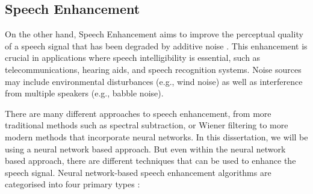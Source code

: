 \documentclass[logo,bsc,singlespacing,parskip,online]{infthesis}
\begin{document}

\subsection{Speech Enhancement}
On the other hand, Speech Enhancement aims to improve the perceptual quality of a speech signal that 
has been degraded by additive noise \citep{loizou_speech_2007}. 
This enhancement is crucial in applications where speech intelligibility is essential, such as telecommunications, hearing aids, and speech recognition systems. Noise sources may include environmental disturbances (e.g., wind noise) as well as interference from multiple speakers (e.g., babble noise).

There are many different approaches to speech enhancement, from more traditional methods such as spectral subtraction, or Wiener filtering
to more modern methods that incorporate neural networks. In this dissertation, we will be using a neural network based approach.
But even within the neural network based approach, there are different techniques that can be used to enhance the speech signal. 
Neural network-based speech enhancement algorithms are categorised into four primary types \cite{katagiri_handbook_2000}:
\label{sec:se-methods}
\end{document}
